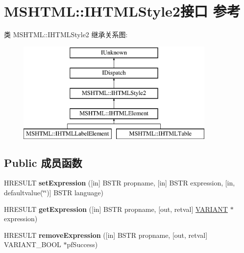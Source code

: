 \hypertarget{interface_m_s_h_t_m_l_1_1_i_h_t_m_l_style2}{}\section{M\+S\+H\+T\+ML\+:\+:I\+H\+T\+M\+L\+Style2接口 参考}
\label{interface_m_s_h_t_m_l_1_1_i_h_t_m_l_style2}
类 M\+S\+H\+T\+ML\+:\+:I\+H\+T\+M\+L\+Style2 继承关系图\+:\begin{figure}[H]
\begin{center}
\leavevmode
\includegraphics[height=5.000000cm]{interface_m_s_h_t_m_l_1_1_i_h_t_m_l_style2}
\end{center}
\end{figure}
\subsection*{Public 成员函数}
\begin{DoxyCompactItemize}
\item 
\mbox{\label{interface_m_s_h_t_m_l_1_1_i_h_t_m_l_style2_aef325f769390fc0bd9459255b8fdf4a1}} 
H\+R\+E\+S\+U\+LT {\bfseries set\+Expression} (\mbox{[}in\mbox{]} B\+S\+TR propname, \mbox{[}in\mbox{]} B\+S\+TR expression, \mbox{[}in, defaultvalue(\char`\"{}\char`\"{})\mbox{]} B\+S\+TR language)
\item 
\mbox{\label{interface_m_s_h_t_m_l_1_1_i_h_t_m_l_style2_a88795ea2eb1e77f1809d9d25c47fe0c3}} 
H\+R\+E\+S\+U\+LT {\bfseries get\+Expression} (\mbox{[}in\mbox{]} B\+S\+TR propname, \mbox{[}out, retval\mbox{]} \hyperlink{structtag_v_a_r_i_a_n_t}{V\+A\+R\+I\+A\+NT} $\ast$expression)
\item 
\mbox{\label{interface_m_s_h_t_m_l_1_1_i_h_t_m_l_style2_ad5839fc6f9be7643b191ca2459bf2e71}} 
H\+R\+E\+S\+U\+LT {\bfseries remove\+Expression} (\mbox{[}in\mbox{]} B\+S\+TR propname, \mbox{[}out, retval\mbox{]} V\+A\+R\+I\+A\+N\+T\+\_\+\+B\+O\+OL $\ast$pf\+Success)
\end{DoxyCompactItemize}

